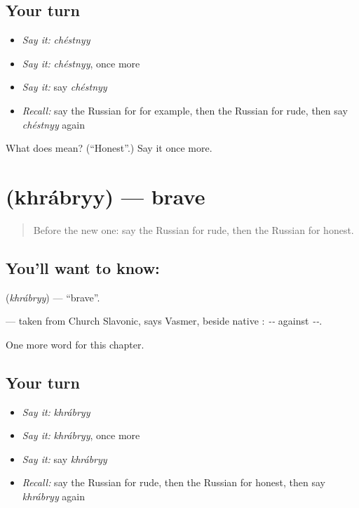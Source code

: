 \subsection*{Your turn}
\begin{itemize}
\raggedright
  \item \emph{Say it:} \emph{chéstnyy}
  \item \emph{Say it:} \emph{chéstnyy}, once more
  \item \emph{Say it:} say \emph{chéstnyy}
  \item \emph{Recall:} say the Russian for for example, then the Russian for rude, then say \emph{chéstnyy} again
\end{itemize}

\begin{tcolorbox}[breakable,colback=teal!4,colframe=teal!35!black,title={Before you move on}]
What does  mean? (\textquotedblleft{}Honest\textquotedblright{}.) Say it once more.
\end{tcolorbox}
\section[\texorpdfstring{\ru{храбрый} (khrábryy)}{храбрый (khrábryy)}]{ (khrábryy) — brave}

\label{lesson:RU-C186-khrabryy}



\begin{quote}
Before the new one: say the Russian for rude, then the Russian for honest.
\end{quote}

\subsection*{You'll want to know: }
\textbf{} (\emph{khrábryy}) — \textquotedblleft{}brave\textquotedblright{}.

\begin{cousinweb}
\textbf{} — taken from Church Slavonic, says Vasmer, beside native \emph{}: \emph{--} against \emph{--}.
\end{cousinweb}

\begin{grammarlens}[title={What you've built}]
One more word for this chapter.
\end{grammarlens}

\subsection*{Your turn}
\begin{itemize}
\raggedright
  \item \emph{Say it:} \emph{khrábryy}
  \item \emph{Say it:} \emph{khrábryy}, once more
  \item \emph{Say it:} say \emph{khrábryy}
  \item \emph{Recall:} say the Russian for rude, then the Russian for honest, then say \emph{khrábryy} again
\end{itemize}

